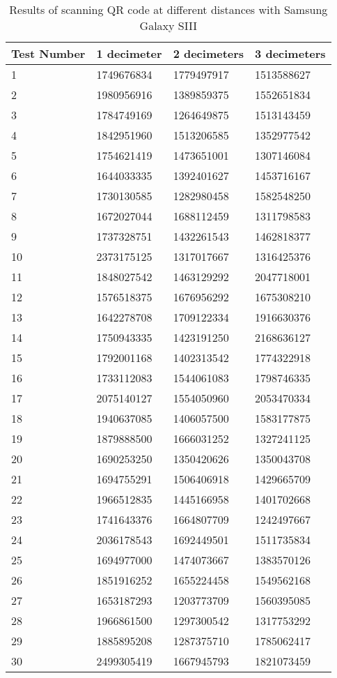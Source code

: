 	\begin{table}[ht!]
    		\caption{Results of scanning QR code at different distances with Samsung Galaxy SIII} \label{tab:distamceGoogleGlassFull}
		\centering \begin{tabularx}{\textwidth}{l|X|X|X} \hline
		Test Number & \textbf{1 decimeter} & \textbf{2 decimeters} & \textbf{3 decimeters} \\ \hline \hline
		
		1&	1749676834	&	1779497917	&	1513588627	\\ \hline
		2&	1980956916	&	1389859375	&	1552651834	\\ \hline
		3&	1784749169	&	1264649875	&	1513143459	\\ \hline
		4&	1842951960	&	1513206585	&	1352977542	\\ \hline
		5&	1754621419	&	1473651001	&	1307146084	\\ \hline
		6&	1644033335	&	1392401627	&	1453716167	\\ \hline
		7&	1730130585	&	1282980458	&	1582548250	\\ \hline
		8&	1672027044	&	1688112459	&	1311798583	\\ \hline
		9&	1737328751	&	1432261543	&	1462818377	\\ \hline
		10&	2373175125	&	1317017667	&	1316425376	\\ \hline
		11&	1848027542	&	1463129292	&	2047718001	\\ \hline
		12&	1576518375	&	1676956292	&	1675308210	\\ \hline
		13&	1642278708	&	1709122334	&	1916630376	\\ \hline
		14&	1750943335	&	1423191250	&	2168636127	\\ \hline
		15&	1792001168	&	1402313542	&	1774322918	\\ \hline
		16&	1733112083	&	1544061083	&	1798746335	\\ \hline
		17&	2075140127	&	1554050960	&	2053470334	\\ \hline
		18&	1940637085	&	1406057500	&	1583177875	\\ \hline
		19&	1879888500	&	1666031252	&	1327241125	\\ \hline
		20&	1690253250	&	1350420626	&	1350043708	\\ \hline
		21&	1694755291	&	1506406918	&	1429665709	\\ \hline
		22&	1966512835	&	1445166958	&	1401702668	\\ \hline
		23&	1741643376	&	1664807709	&	1242497667	\\ \hline
		24&	2036178543	&	1692449501	&	1511735834	\\ \hline
		25&	1694977000	&	1474073667	&	1383570126	\\ \hline
		26&	1851916252	&	1655224458	&	1549562168	\\ \hline
		27&	1653187293	&	1203773709	&	1560395085	\\ \hline
		28&	1966861500	&	1297300542	&	1317753292	\\ \hline
		29&	1885895208	&	1287375710	&	1785062417	\\ \hline
		30&	2499305419	&	1667945793	&	1821073459	\\ \hline

		\end{tabularx}
	\end{table}